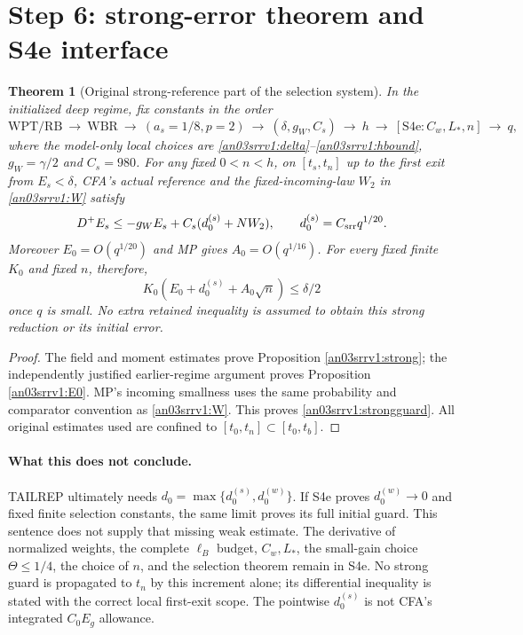 \documentclass[11pt]{article}
\numberwithin{equation}{section}
\newtheorem{theorem}{Theorem}[section]
\theoremstyle{remark}\newtheorem{remark}[theorem]{Remark}
\begin{document}
\section{Step 6: strong-error theorem and S4e interface}
\begin{theorem}[Original strong-reference part of the selection system]
\label{an03srrv1:main}
In the initialized deep regime, fix constants in the order
\[
 \mathrm{WPT/RB}\ \longrightarrow\ \mathrm{WBR}\
 \longrightarrow\ (a_s=1/8,p=2)\
 \longrightarrow\ (\delta,g_W,C_s)\
 \longrightarrow\ h\
 \longrightarrow\ [\mathrm{S4e}:C_w,L_*,n]\
 \longrightarrow\ q,
\]
where the model-only local choices are
\eqref{an03srrv1:delta}--\eqref{an03srrv1:hbound},
$g_W=\gamma/2$ and $C_s=980$.
For any fixed $0<n<h$, on $[t_s,t_n]$ up to the first exit from
$E_s<\delta$, CFA's actual reference and the fixed-incoming-law
$W_2$ in \eqref{an03srrv1:W} satisfy
\[
 D^+E_s\le-g_WE_s+C_s(d_0^{(s)}+NW_2),\qquad
 d_0^{(s)}=C_{\rm srr}q^{1/20}.
\]
Moreover $E_0=O(q^{1/20})$ and MP gives $A_0=O(q^{1/16})$.
For every fixed finite $K_0$ and fixed $n$, therefore,
\begin{equation}
 K_0(E_0+d_0^{(s)}+A_0\sqrt n)\le\delta/2
 \label{an03srrv1:strongguard}
\end{equation}
once $q$ is small. No extra retained inequality is assumed to obtain
this strong reduction or its initial error.
\end{theorem}
\begin{proof}
The field and moment estimates prove Proposition
\ref{an03srrv1:strong}; the independently justified earlier-regime
argument proves Proposition \ref{an03srrv1:E0}. MP's incoming
smallness uses the same probability and comparator convention as
\eqref{an03srrv1:W}. This proves \eqref{an03srrv1:strongguard}.
All original estimates used are confined to $[t_0,t_n]\subset[t_0,t_b]$.
\end{proof}

\paragraph{What this does not conclude.}
TAILREP ultimately needs $d_0=\max\{d_0^{(s)},d_0^{(w)}\}$.
If S4e proves $d_0^{(w)}\to0$ and fixed finite selection constants,
the same limit proves its full initial guard. This sentence does
not supply that missing weak estimate. The derivative of normalized
weights, the complete $\ell_B$ budget, $C_w,L_*$, the small-gain
choice $\Theta\le1/4$, the choice of $n$, and the selection theorem
remain in S4e. No strong guard is propagated to $t_n$ by this
increment alone; its differential inequality is stated with the
correct local first-exit scope. The pointwise $d_0^{(s)}$ is not
CFA's integrated $C_0E_g$ allowance.
\end{document}
